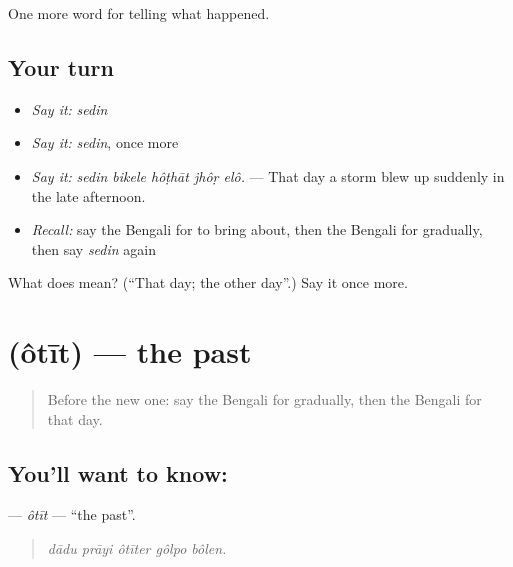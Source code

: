 \begin{grammarlens}[title={What you've built}]
One more word for telling what happened.
\end{grammarlens}

\subsection*{Your turn}
\begin{itemize}
\raggedright
  \item \emph{Say it:} \emph{sedin}
  \item \emph{Say it:} \emph{sedin}, once more
  \item \emph{Say it:} \emph{sedin bikele hôṭhāt jhôṛ elô.} — That day a storm blew up suddenly in the late afternoon.
  \item \emph{Recall:} say the Bengali for to bring about, then the Bengali for gradually, then say \emph{sedin} again
\end{itemize}

\begin{tcolorbox}[breakable,colback=teal!4,colframe=teal!35!black,title={Before you move on}]
What does  mean? (\textquotedblleft{}That day; the other day\textquotedblright{}.) Say it once more.
\end{tcolorbox}
\section[\texorpdfstring{\bn{অতীত} (ôtīt)}{অতীত (ôtīt)}]{ (ôtīt) — the past}

\label{lesson:BN-C303-otit}



\begin{quote}
Before the new one: say the Bengali for gradually, then the Bengali for that day.
\end{quote}

\subsection*{You'll want to know: }
\textbf{} — \emph{ôtīt} — \textquotedblleft{}the past\textquotedblright{}.

\begin{quote}
    
\end{quote}

\begin{quote}
\emph{dādu prāyi ôtīter gôlpo bôlen.}
\end{quote}


